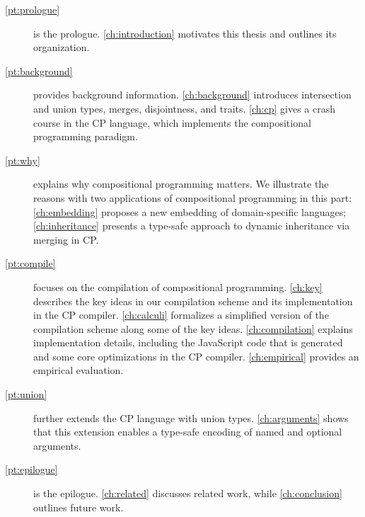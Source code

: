 \begin{description}
\item[\autoref{pt:prologue}] is the prologue. \autoref{ch:introduction}
      motivates this thesis and outlines its organization.
\item[\autoref{pt:background}] provides background information.
      \autoref{ch:background} introduces intersection and union types, merges,
      disjointness, and traits. \autoref{ch:cp} gives a crash course in the CP
      language, which implements the compositional programming paradigm.
\item[\autoref{pt:why}] explains why compositional programming matters. We
      illustrate the reasons with two applications of compositional programming
      in this part: \autoref{ch:embedding} proposes a new embedding of
      domain-specific languages; \autoref{ch:inheritance} presents a type-safe
      approach to dynamic inheritance via merging in CP.
\item[\autoref{pt:compile}] focuses on the compilation of compositional
      programming. \autoref{ch:key} describes the key ideas in our compilation
      scheme and its implementation in the CP compiler. \autoref{ch:calculi}
      formalizes a simplified version of the compilation scheme along some of
      the key ideas. \autoref{ch:compilation} explains implementation details,
      including the JavaScript code that is generated and some core
      optimizations in the CP compiler. \autoref{ch:empirical} provides an
      empirical evaluation.
\item[\autoref{pt:union}] further extends the CP language with union types.
      \autoref{ch:arguments} shows that this extension enables a type-safe
      encoding of named and optional arguments.
\item[\autoref{pt:epilogue}] is the epilogue. \autoref{ch:related} discusses
      related work, while \autoref{ch:conclusion} outlines future work.
\end{description}

\pagebreak

